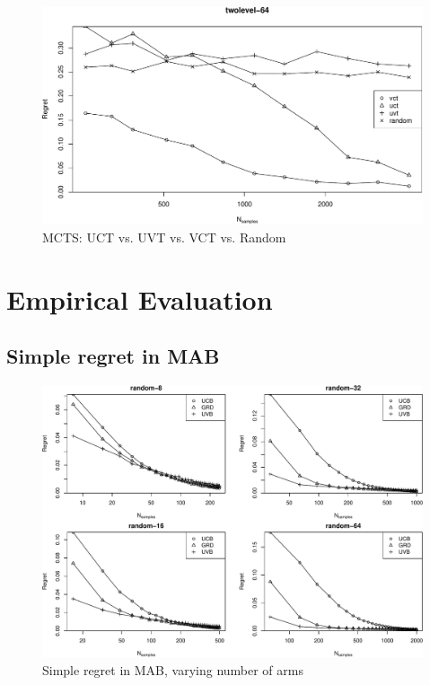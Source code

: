 \documentclass{article}
\begin{document}
\begin{figure}[t]
\centering
\includegraphics[scale=0.64,trim=0pt 0pt 0pt 24pt,clip]{twolevel-64.pdf}
\caption{MCTS: UCT vs. UVT vs. VCT vs. Random}
\label{fig:twolevel-64}
\end{figure}

\section{Empirical Evaluation}

\subsection{Simple regret in MAB}


\begin{figure}[t]
\centering
\includegraphics[scale=0.64,trim=0pt 0pt 0pt 0pt,clip]{onelevel-8-16-32-64.pdf}
\caption{Simple regret in MAB, varying number of arms}
\label{fig:onelevel-8-16-32-64}
\end{figure}
\end{document}

